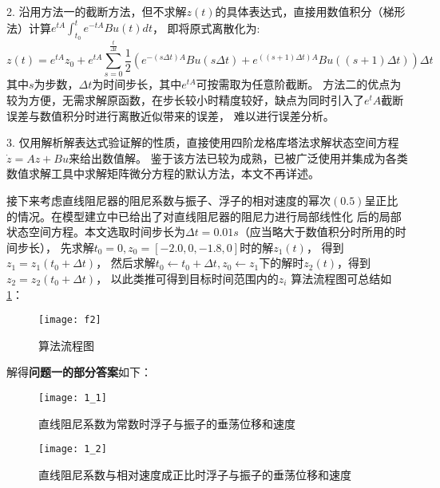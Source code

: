 \documentclass[withoutpreface,bwprint]{cumcmthesis} %
\begin{document}
    2. 沿用方法一的截断方法，但不求解$ z(t) $的具体表达式，直接用数值积分（梯形法）计算$ e^{tA}\int_{t_0}^t e^{-tA}Bu(t)dt $，
    即将原式离散化为:
    $$ z(t) = e^{tA}z_0
     + e^{tA}\sum\limits_{s = 0}^{\frac{t}{\Delta t}} \frac{1}{2}(e^{-(s \Delta t)A}Bu(s \Delta t) 
     + e^{((s + 1) \Delta t)A}Bu((s + 1)\Delta t))\Delta t $$
    其中$ s $为步数，$ \Delta t $为时间步长，其中$ e^{tA} $可按需取为任意阶截断。
    方法二的优点为较为方便，无需求解原函数，在步长较小时精度较好，缺点为同时引入了$e^tA$截断误差与数值积分时进行离散近似带来的误差，
    难以进行误差分析。

    3. 仅用解析解表达式验证解的性质，直接使用四阶龙格库塔法求解状态空间方程$ \dot{z}= Az + Bu$来给出数值解。
    鉴于该方法已较为成熟，已被广泛使用并集成为各类数值求解工具中求解矩阵微分方程的默认方法，本文不再详述。

    接下来考虑直线阻尼器的阻尼系数与振子、浮子的相对速度的幂次$(0.5)$呈正比的情况。在模型建立中已给出了对直线阻尼器的阻尼力进行局部线性化
    后的局部状态空间方程。本文选取时间步长为$ \Delta t = 0.01s$（应当略大于数值积分时所用的时间步长），
    先求解$ t_0 = 0, z_0 = [-2.0, 0, -1.8, 0]$时的解$z_1(t)$，
    得到$ z_1 = z_1(t_0 + \Delta t) $，
    然后求解$ t_0 \leftarrow t_0 + \Delta t, z_0 \leftarrow z_1$下的解时$z_2(t)$，得到$ z_2 = z_2(t_0 + \Delta t) $，
    以此类推可得到目标时间范围内的$ z_i $ 算法流程图可总结如 \cref{fig:algorithm}：

    \begin{figure}[H]
        \centering
        \texttt{[image: f2]}
        \caption{算法流程图}
        \label{fig:algorithm}
    \end{figure}

    解得\textbf{问题一的部分答案}如下：

    \begin{figure}[H]
        \centering
        \texttt{[image: 1\_1]}
        \caption{直线阻尼系数为常数时浮子与振子的垂荡位移和速度}
        \label{fig:1_1}
    \end{figure}

    \begin{figure}[H]
        \centering
        \texttt{[image: 1\_2]}
        \caption{直线阻尼系数与相对速度成正比时浮子与振子的垂荡位移和速度}
        \label{fig:1_2}
    \end{figure}
\end{document}
